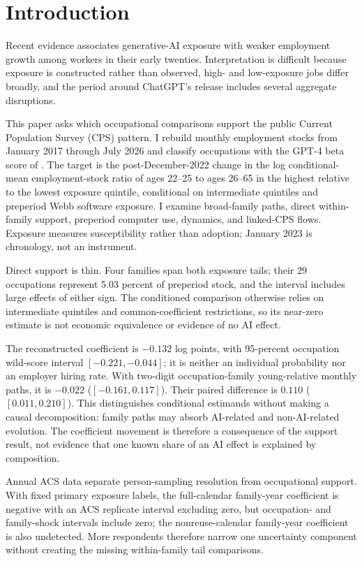 \section{Introduction}\label{sec:introduction}

Recent evidence associates generative-AI exposure with weaker employment growth among workers in their early twenties.  Interpretation is difficult because exposure is constructed rather than observed, high- and low-exposure jobs differ broadly, and the period around ChatGPT's release includes several aggregate disruptions.

This paper asks which occupational comparisons support the public Current Population Survey (CPS) pattern.  I rebuild monthly employment stocks from January 2017 through July 2026 and classify occupations with the GPT-4 beta score of \citet{eloundou2024gpts}.  The target is the post-December-2022 change in the log conditional-mean employment-stock ratio of ages 22--25 to ages 26--65 in the highest relative to the lowest exposure quintile, conditional on intermediate quintiles and preperiod Webb software exposure.  I examine broad-family paths, direct within-family support, preperiod computer use, dynamics, and linked-CPS flows.  Exposure measures susceptibility rather than adoption; January 2023 is chronology, not an instrument.

Direct support is thin.  Four families span both exposure tails; their 29 occupations represent 5.03 percent of preperiod stock, and the interval includes large effects of either sign.  The conditioned comparison otherwise relies on intermediate quintiles and common-coefficient restrictions, so its near-zero estimate is not economic equivalence or evidence of no AI effect.

The reconstructed coefficient is $-0.132$ log points, with 95-percent occupation wild-score interval $[-0.221,-0.044]$; it is neither an individual probability nor an employer hiring rate.  With two-digit occupation-family young-relative monthly paths, it is $-0.022$ ($[-0.161,0.117]$).  Their paired difference is $0.110$ ($[0.011,0.210]$).  This distinguishes conditional estimands without making a causal decomposition: family paths may absorb AI-related and non-AI-related evolution.  The coefficient movement is therefore a consequence of the support result, not evidence that one known share of an AI effect is explained by composition.

Annual ACS data separate person-sampling resolution from occupational support.
With fixed primary exposure labels, the full-calendar family-year coefficient is negative
with an ACS replicate interval excluding zero, but occupation- and family-shock
intervals include zero; the nonreuse-calendar family-year coefficient is also
undetected.  More respondents therefore narrow one uncertainty component
without creating the missing within-family tail comparisons.

